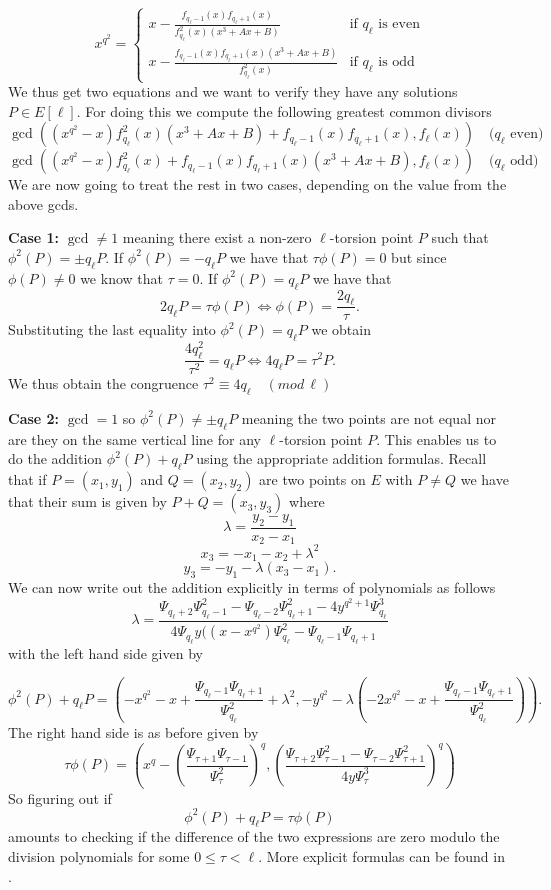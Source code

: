 $$
x^{q^2} = \begin{cases}
           x - \frac{f_{q_\ell-1}(x) f_{q_\ell+1}(x)}{f_{q_\ell}^2(x) (x^3+Ax+B)} & \text{if } q_\ell \text{ is even} \\
	   x - \frac{f_{q_\ell-1}(x) f_{q_\ell+1}(x) (x^3+Ax+B)}{f_{q_\ell}^2(x)} & \text{if } q_\ell \text{ is odd} 
          \end{cases}
$$
We thus get two equations and we want to verify they have any solutions $P \in E[\ell]$. For
doing this we compute the following greatest common divisors
$$ \gcd((x^{q^2} - x)f_{q_\ell}^2(x) (x^3+Ax+B)+f_{q_\ell-1}(x) f_{q_\ell+1}(x), f_\ell(x)) \quad (q_\ell \text{ even)}$$
$$ \gcd((x^{q^2} - x)f_{q_\ell}^2(x)+f_{q_\ell-1}(x) f_{q_\ell+1}(x) (x^3+Ax+B), f_\ell(x)) \quad (q_\ell \text{ odd)}$$
We are now going to treat the rest in two cases, depending on the value from the above gcds.

\textbf{Case 1:} $\gcd \neq 1$ meaning there exist a non-zero $\ell$-torsion point $P$ such that $\phi^2(P) = \pm q_\ell P$.
If $\phi^2 (P) = -q_\ell P$ we have that $\tau \phi(P) = 0$ but since $\phi(P) \neq 0$ we know that $\tau = 0$.
If $\phi^2(P) = q_\ell P$ we have that 
$$ 2 q_\ell P = \tau \phi(P) \Leftrightarrow \phi(P) = \frac{2 q_\ell}{\tau}. $$
Substituting the last equality into $\phi^2(P) = q_\ell P$ we obtain
$$ \frac{4 q_\ell^2}{\tau^2} = q_\ell P \Leftrightarrow 4 q_\ell P = \tau^2 P. $$
We thus obtain the congruence $\tau^2 \equiv 4q_\ell \quad (mod\, \ell)$

\textbf{Case 2:} $\gcd = 1$ so $\phi^2(P) \neq \pm q_\ell P$ meaning the two points are 
not equal nor are they on the same vertical line for any $\ell$-torsion point $P$. 
This enables us to do the addition $\phi^2(P) + q_\ell P$ using the appropriate addition formulas.
Recall that if $P = (x_1, y_1)$ and $Q = (x_2, y_2)$ are two points on $E$ with
$P \neq Q$ we have that their sum is given by $P+Q = (x_3, y_3)$ where
$$ \lambda = \frac{y_2 - y_1}{x_2 - x_1} $$
$$ x_3 = -x_1 - x_2 + \lambda^2 $$
$$ y_3 = -y_1 -\lambda(x_3 - x_1).$$
We can now write out the addition explicitly in terms of polynomials as follows
$$ \lambda = \frac{\Psi_{q_\ell+2} \Psi_{q_\ell-1}^2 - \Psi_{q_\ell-2}\Psi_{q_\ell+1}^2 - 4y^{q^2+1}\Psi_{q_\ell}^3}
		  {4\Psi_{q_\ell} y ((x-x^{q^2})\Psi_{q_\ell}^2 - \Psi_{q_\ell-1}\Psi_{q_\ell+1}} $$
with the left hand side given by

$$\phi^2 (P) + q_\ell P = \left(-x^{q^2}-x+\frac{\Psi_{q_\ell-1}\Psi_{q_\ell+1}}{\Psi_{q_\ell}^2}+\lambda^2,
		     -y^{q^2}-\lambda\left(-2x^{q^2}-x+\frac{\Psi_{q_\ell-1}\Psi_{q_\ell+1}}{\Psi_{q_\ell}^2}\right)\right).$$
The right hand side is as before given by
$$ \tau\phi(P)=\left(x^q-\left(\frac{\Psi_{\tau+1}\Psi_{\tau-1}}{\Psi_\tau^2}\right)^q,\left(\frac{\Psi_{\tau+2}\Psi_{\tau-1}^2 - \Psi_{\tau-2}\Psi_{\tau+1}^2}{4y\Psi_\tau^3}\right)^q\right) $$
So figuring out if $$\phi^2(P) + q_\ell P = \tau \phi(P) $$ amounts to checking if the difference
of the two expressions are zero modulo the division polynomials for some $0 \leq \tau < \ell$.
More explicit formulas can be found in \cite{Schoof85}.

